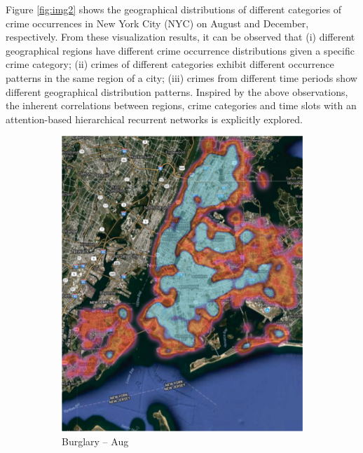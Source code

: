 Figure \ref{fig:img2} shows the geographical distributions of different categories of crime occurrences in New York City (NYC) on August
and December, respectively. From these visualization results, it
can be observed that (i) different geographical regions have different
crime occurrence distributions given a specific crime category; (ii)
crimes of different categories exhibit different occurrence patterns
in the same region of a city; (iii) crimes from different time periods
show different geographical distribution patterns. Inspired by the
above observations, the inherent correlations between regions, crime categories and time slots with an attention-based hierarchical recurrent networks is explicitly explored.
\begin{figure}[t]
\captionsetup[subfigure]{font=scriptsize,labelfont=scriptsize}
\centering
\begin{subfigure}{0.24\textwidth}
\centering
\includegraphics[width=0.9\linewidth]{Chapter5/Images/burglary.png} 
\caption{Burglary – Aug}
\label{fig:subim1}
\end{subfigure}
\begin{subfigure}{0.24\textwidth}
\centering

\end{subfigure}
\end{figure}
